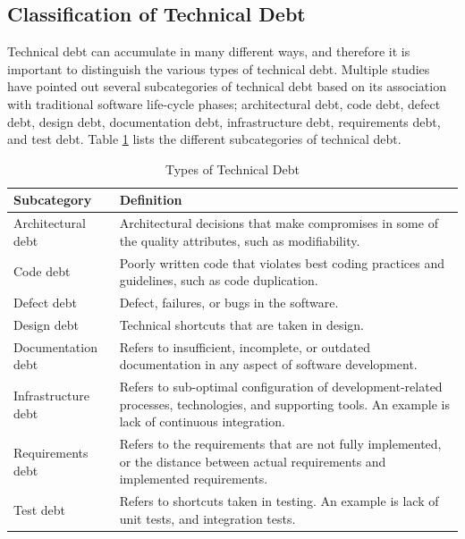\subsection{Classification of Technical Debt}
\label{sub:classificationtechdebt}
Technical debt can accumulate in many different ways, and therefore it is important to distinguish the various types of technical debt. Multiple studies\cite{li2015systematic,p8-codabux,foser076-brown,tom2013exploration,Zazworka:2011:PDD:1985362.1985372,Zazworka:2013:CSE:2460999.2461005} have pointed out several subcategories of technical debt based on its association with traditional software life-cycle phases; architectural debt, code debt, defect debt, design debt, documentation debt, infrastructure debt, requirements debt, and test debt. Table \ref{tab:subcategories} lists the different subcategories of technical debt.

\begin{table}
	\centering
	\begin{tabular}{ | p{5cm} | p{8cm} |}
	\hline
	\textbf{Subcategory} & \textbf{Definition} \\ \hline
	Architectural debt\cite{li2015systematic,p8-codabux,foser076-brown} & Architectural decisions that make compromises in some of the quality attributes, such as modifiability. \\ \hline
	Code debt\cite{li2015systematic,foser076-brown,tom2013exploration} & Poorly written code that violates best coding practices and guidelines, such as code duplication. \\ \hline
	Defect debt\cite{li2015systematic,tom2013exploration} & Defect, failures, or bugs in the software. \\ \hline
	Design debt\cite{li2015systematic,Zazworka:2011:PDD:1985362.1985372,foser076-brown} & Technical shortcuts that are taken in design.\\ \hline
	Documentation debt\cite{li2015systematic,foser076-brown,Zazworka:2013:CSE:2460999.2461005} & Refers to insufficient, incomplete, or outdated documentation in any aspect of software development.\\ \hline
	Infrastructure debt\cite{li2015systematic,tom2013exploration,p8-codabux} & Refers to sub-optimal configuration of development-related processes, technologies, and supporting tools. An example is lack of continuous integration.\\ \hline
	Requirements debt\cite{li2015systematic,Zazworka:2013:CSE:2460999.2461005} & Refers to the requirements that are not fully implemented, or the distance between actual requirements and implemented requirements.\\ \hline
	Test debt\cite{li2015systematic,Zazworka:2013:CSE:2460999.2461005,foser076-brown} & Refers to shortcuts taken in testing. An example is lack of unit tests, and integration tests.\\
	\hline
	\end{tabular}
	\caption{Types of Technical Debt} \label{tab:subcategories}
\end{table}


